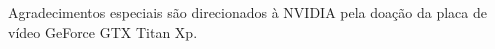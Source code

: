 
\begin{agradecimentos}[Agradecimentos]

Agradecimentos especiais são direcionados à NVIDIA pela doação da placa de vídeo GeForce GTX Titan Xp.

\end{agradecimentos}
